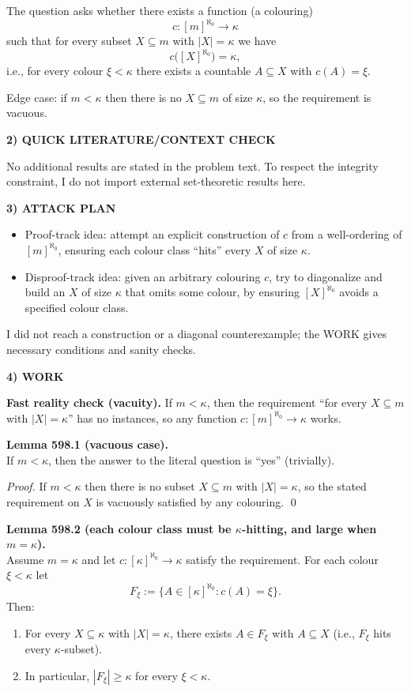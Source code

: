 The question asks whether there exists a function (a colouring)
\[
c : [m]^{\aleph_0} \to \kappa
\]
such that for every subset $X\subseteq m$ with $|X|=\kappa$ we have
\[
 c\big([X]^{\aleph_0}\big) = \kappa,
\]
i.e., for every colour $\xi<\kappa$ there exists a countable $A\subseteq X$ with $c(A)=\xi$.

Edge case: if $m<\kappa$ then there is no $X\subseteq m$ of size $\kappa$, so the requirement is vacuous.

\noindent\textbf{2) QUICK LITERATURE/CONTEXT CHECK}\par
No additional results are stated in the problem text. To respect the integrity constraint, I do not import external set-theoretic results here.

\noindent\textbf{3) ATTACK PLAN}\par
\begin{itemize}
\item Proof-track idea: attempt an explicit construction of $c$ from a well-ordering of $[m]^{\aleph_0}$, ensuring each colour class ``hits'' every $X$ of size $\kappa$.
\item Disproof-track idea: given an arbitrary colouring $c$, try to diagonalize and build an $X$ of size $\kappa$ that omits some colour, by ensuring $[X]^{\aleph_0}$ avoids a specified colour class.
\end{itemize}
I did not reach a construction or a diagonal counterexample; the WORK gives necessary conditions and sanity checks.

\noindent\textbf{4) WORK}\par
\textbf{Fast reality check (vacuity).} If $m<\kappa$, then the requirement ``for every $X\subseteq m$ with $|X|=\kappa$'' has no instances, so any function $c:[m]^{\aleph_0}\to\kappa$ works.

\medskip
\noindent\textbf{Lemma 598.1 (vacuous case).}\\
If $m<\kappa$, then the answer to the literal question is ``yes'' (trivially).

\noindent\emph{Proof.} If $m<\kappa$ then there is no subset $X\subseteq m$ with $|X|=\kappa$, so the stated requirement on $X$ is vacuously satisfied by any colouring. \qed

\medskip
\noindent\textbf{Lemma 598.2 (each colour class must be $\kappa$-hitting, and large when $m=\kappa$).}\\
Assume $m=\kappa$ and let $c:[\kappa]^{\aleph_0}\to\kappa$ satisfy the requirement. For each colour $\xi<\kappa$ let
\[
F_{\xi}:=\{A\in[\kappa]^{\aleph_0}: c(A)=\xi\}.
\]
Then:
\begin{enumerate}
\item For every $X\subseteq\kappa$ with $|X|=\kappa$, there exists $A\in F_{\xi}$ with $A\subseteq X$ (i.e., $F_{\xi}$ hits every $\kappa$-subset).
\item In particular, $|F_{\xi}|\ge\kappa$ for every $\xi<\kappa$.
\end{enumerate}

